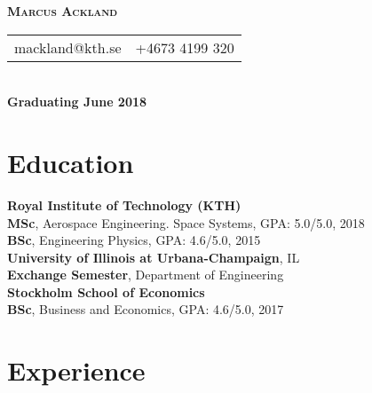 \documentclass[10pt]{article}
\begin{document}

\centerline{\LARGE \textbf{\textsc{Marcus Ackland}}}

\begin{center}
  \begin{tabular}{l r}
    mackland@kth.se&+4673 4199 320
  \end{tabular} \\
  \vspace{0.1em}
  \textbf{Graduating June 2018}
\end{center}

\section*{Education}
\vspace{0.2em}
\hline
\vspace{0.5em}
\noindent\textbf{Royal Institute of Technology (KTH)}\\
\indent \textbf{MSc}, Aerospace Engineering. Space Systems, GPA: 5.0/5.0, 2018\\
\indent \textbf{BSc}, Engineering Physics, GPA: 4.6/5.0, 2015\\

\noindent\textbf{University of Illinois at Urbana-Champaign}, IL\\
\indent \textbf{Exchange Semester}, Department of Engineering\\



\noindent\textbf{Stockholm School of Economics}\\
\indent \textbf{BSc}, Business and Economics, GPA: 4.6/5.0, 2017\\
%

\section*{Experience}
\vspace{0.2em}
\hline
\vspace{0.5em}
\end{document}
